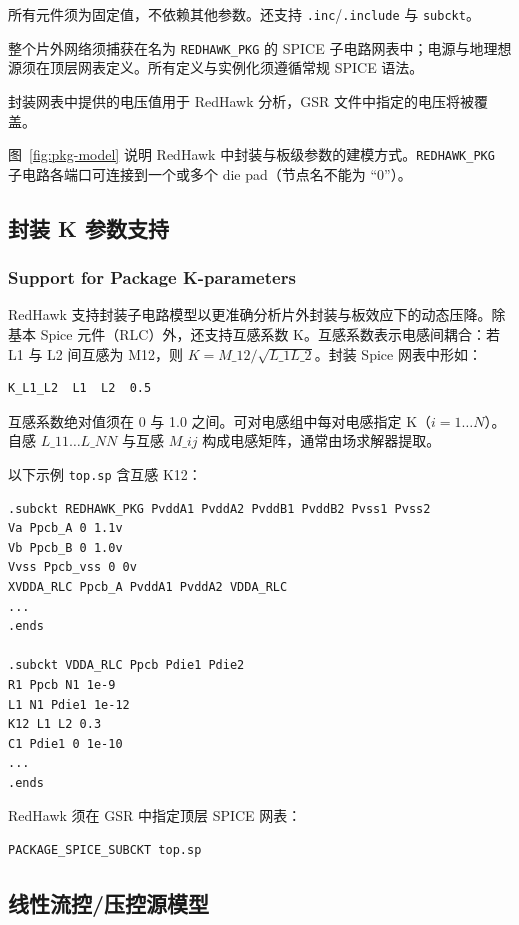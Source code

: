 所有元件须为固定值，不依赖其他参数。还支持 \texttt{.inc}/\texttt{.include} 与 \texttt{subckt}。

整个片外网络须捕获在名为 \texttt{REDHAWK\_PKG} 的 SPICE 子电路网表中；电源与地理想源须在顶层网表定义。所有定义与实例化须遵循常规 SPICE 语法。

\begin{noteBox}
封装网表中提供的电压值用于 RedHawk 分析，GSR 文件中指定的电压将被覆盖。
\end{noteBox}

图~\ref{fig:pkg-model} 说明 RedHawk 中封装与板级参数的建模方式。\texttt{REDHAWK\_PKG} 子电路各端口可连接到一个或多个 die pad（节点名不能为 ``0''）。


\subsection{封装 K 参数支持}
\subsubsection*{Support for Package K-parameters}

RedHawk 支持封装子电路模型以更准确分析片外封装与板效应下的动态压降。除基本 Spice 元件（RLC）外，还支持互感系数 K。互感系数表示电感间耦合：若 L1 与 L2 间互感为 M12，则 $K = M\_{12}/\sqrt{L\_1 L\_2}$。封装 Spice 网表中形如：
\begin{lstlisting}
K_L1_L2  L1  L2  0.5
\end{lstlisting}
互感系数绝对值须在 0 与 1.0 之间。可对电感组中每对电感指定 K（$i=1\ldots N$）。自感 $L\_{11}\ldots L\_{NN}$ 与互感 $M\_{ij}$ 构成电感矩阵，通常由场求解器提取。

以下示例 \texttt{top.sp} 含互感 K12：
\begin{lstlisting}
.subckt REDHAWK_PKG PvddA1 PvddA2 PvddB1 PvddB2 Pvss1 Pvss2
Va Ppcb_A 0 1.1v
Vb Ppcb_B 0 1.0v
Vvss Ppcb_vss 0 0v
XVDDA_RLC Ppcb_A PvddA1 PvddA2 VDDA_RLC
...
.ends

.subckt VDDA_RLC Ppcb Pdie1 Pdie2
R1 Ppcb N1 1e-9
L1 N1 Pdie1 1e-12
K12 L1 L2 0.3
C1 Pdie1 0 1e-10
...
.ends
\end{lstlisting}

RedHawk 须在 GSR 中指定顶层 SPICE 网表：
\begin{lstlisting}
PACKAGE_SPICE_SUBCKT top.sp
\end{lstlisting}

\subsection{线性流控/压控源模型}
